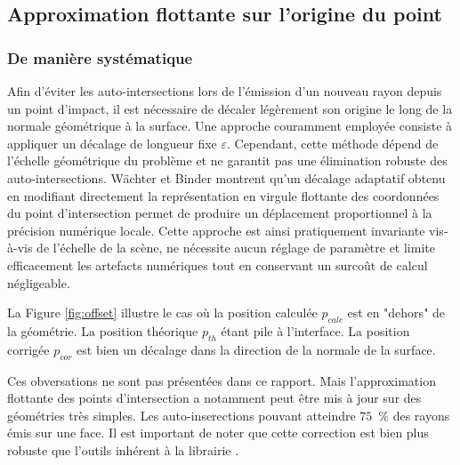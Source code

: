 \subsection{Approximation flottante sur l'origine du point}
\subsubsection{De manière systématique}
Afin d'éviter les auto-intersections lors de l'émission d'un nouveau rayon depuis un point d'impact, il est nécessaire de décaler légèrement son origine le long de la normale géométrique à la surface. Une approche couramment employée consiste à appliquer un décalage de longueur fixe $\varepsilon$. Cependant, cette méthode dépend de l'échelle géométrique du problème et ne garantit pas une élimination robuste des auto-intersections. Wächter et Binder \cite{Wachter2019} montrent qu'un décalage adaptatif obtenu en modifiant directement la représentation en virgule flottante des coordonnées du point d'intersection permet de produire un déplacement proportionnel à la précision numérique locale. Cette approche est ainsi pratiquement invariante vis-à-vis de l'échelle de la scène, ne nécessite aucun réglage de paramètre et limite efficacement les artefacts numériques tout en conservant un surcoût de calcul négligeable.

La Figure \ref{fig:offset} illustre le cas où la position calculée $p_{calc}$ est en "dehors" de la géométrie. La position théorique $p_{th}$ étant pile à l'interface. La position corrigée $p_{cor}$ est bien un décalage dans la direction de la normale de la surface.

Ces obversations ne sont pas présentées dans ce rapport. Mais l'approximation flottante des points d'intersection a notamment peut être mis à jour sur des géométries très simples. Les auto-inserections pouvant atteindre $75$~\% des rayons émis sur une face. Il est important de noter que cette correction est bien plus robuste que l'outils inhérent à la librairie .

